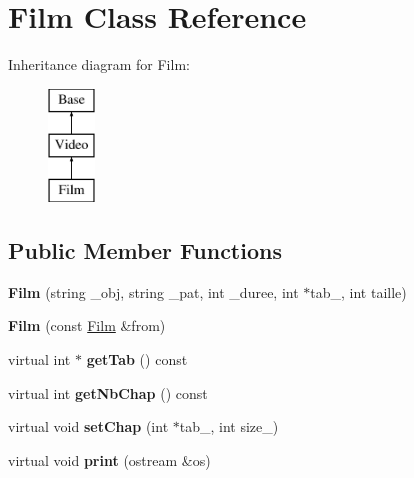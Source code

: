 \hypertarget{class_film}{}\section{Film Class Reference}
\label{class_film}
Inheritance diagram for Film\+:\begin{figure}[H]
\begin{center}
\leavevmode
\includegraphics[height=3.000000cm]{class_film}
\end{center}
\end{figure}
\subsection*{Public Member Functions}
\begin{DoxyCompactItemize}
\item 
{\bfseries Film} (string \+\_\+obj, string \+\_\+pat, int \+\_\+duree, int $\ast$tab\+\_\+, int taille)\hypertarget{class_film_a9894b9e20dc8f5c5252743f53fe09bcb}{}\label{class_film_a9894b9e20dc8f5c5252743f53fe09bcb}

\item 
{\bfseries Film} (const \hyperlink{class_film}{Film} \&from)\hypertarget{class_film_a68f781851622ec80878c9a6e7ccb925e}{}\label{class_film_a68f781851622ec80878c9a6e7ccb925e}

\item 
virtual int $\ast$ {\bfseries get\+Tab} () const \hypertarget{class_film_ae05005bb993102212a5d1a0e5e582a2a}{}\label{class_film_ae05005bb993102212a5d1a0e5e582a2a}

\item 
virtual int {\bfseries get\+Nb\+Chap} () const \hypertarget{class_film_a750d6b5424e36ce2e28b2014a99decfd}{}\label{class_film_a750d6b5424e36ce2e28b2014a99decfd}

\item 
virtual void {\bfseries set\+Chap} (int $\ast$tab\+\_\+, int size\+\_\+)\hypertarget{class_film_a82a135c994d7fb715fad0ca72f9b75ee}{}\label{class_film_a82a135c994d7fb715fad0ca72f9b75ee}

\item 
virtual void {\bfseries print} (ostream \&os)\hypertarget{class_film_a7f1d7c74e51b17842adcd580c5e139ca}{}\label{class_film_a7f1d7c74e51b17842adcd580c5e139ca}

\end{DoxyCompactItemize}
